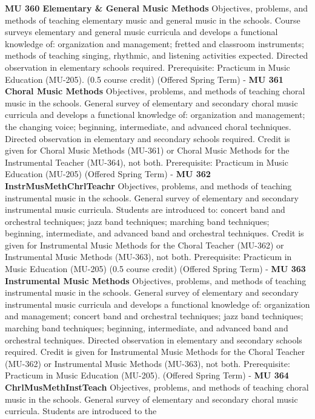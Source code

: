\documentclass[
  letterpaper,
]{scrbook}
\begin{document}
\textbf{MU 360 Elementary \& General Music Methods} Objectives,
problems, and methods of teaching elementary music and general music in
the schools. Course surveys elementary and general music curricula and
develops a functional knowledge of: organization and management; fretted
and classroom instruments; methods of teaching singing, rhythmic, and
listening activities expected. Directed observation in elementary
schools required. Prerequisite: Practicum in Music Education (MU-205).
(0.5 course credit) (Offered Spring Term) - \textbf{MU 361 Choral Music
Methods} Objectives, problems, and methods of teaching choral music in
the schools. General survey of elementary and secondary choral music
curricula and develops a functional knowledge of: organization and
management; the changing voice; beginning, intermediate, and advanced
choral techniques. Directed observation in elementary and secondary
schools required. Credit is given for Choral Music Methods (MU-361) or
Choral Music Methods for the Instrumental Teacher (MU-364), not both.
Prerequisite: Practicum in Music Education (MU-205) (Offered Spring
Term) - \textbf{MU 362 InstrMusMethChrlTeachr} Objectives, problems, and
methods of teaching instrumental music in the schools. General survey of
elementary and secondary instrumental music curricula. Students are
introduced to: concert band and orchestral techniques; jazz band
techniques; marching band techniques; beginning, intermediate, and
advanced band and orchestral techniques. Credit is given for
Instrumental Music Methods for the Choral Teacher (MU-362) or
Instrumental Music Methods (MU-363), not both. Prerequisite: Practicum
in Music Education (MU-205) (0.5 course credit) (Offered Spring Term) -
\textbf{MU 363 Instrumental Music Methods} Objectives, problems, and
methods of teaching instrumental music in the schools. General survey of
elementary and secondary instrumental music curricula and develops a
functional knowledge of: organization and management; concert band and
orchestral techniques; jazz band techniques; marching band techniques;
beginning, intermediate, and advanced band and orchestral techniques.
Directed observation in elementary and secondary schools required.
Credit is given for Instrumental Music Methods for the Choral Teacher
(MU-362) or Instrumental Music Methods (MU-363), not both. Prerequisite:
Practicum in Music Education (MU-205). (Offered Spring Term) -
\textbf{MU 364 ChrlMusMethInstTeach} Objectives, problems, and methods
of teaching choral music in the schools. General survey of elementary
and secondary choral music curricula. Students are introduced to the
\end{document}
